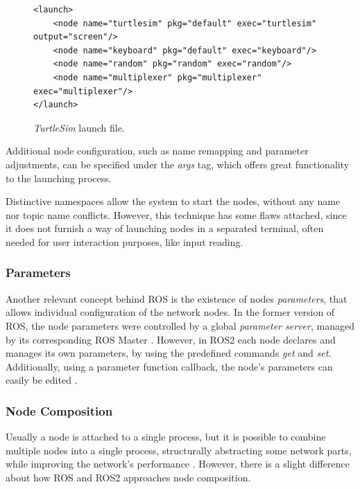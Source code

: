 \begin{figure}[H]
\begin{lstlisting}[otherkeywords={launch, node, name, pkg, exec, output}]
<launch>
    <node name="turtlesim" pkg="default" exec="turtlesim" output="screen"/>
    <node name="keyboard" pkg="default" exec="keyboard"/>
    <node name="random" pkg="random" exec="random"/>
    <node name="multiplexer" pkg="multiplexer" exec="multiplexer"/>
</launch>
\end{lstlisting}
\caption{\textit{TurtleSim} launch file.}
\label{fig:ros-lf}
\end{figure}

Additional node configuration, such as name remapping and parameter adjustments, can be specified under the \textit{args} tag, which offers great functionality to the launching process. 

Distinctive namespaces allow the system to start the nodes, without any name nor topic name conflicts. However, this technique has some flaws attached, since it does not furnish a way of launching nodes in a separated terminal, often needed for user interaction purposes, like input reading.

\subsubsection{Parameters}   

Another relevant concept behind ROS is the existence of nodes \textit{parameters}, that allows individual configuration of the network nodes. In the former version of ROS, the node parameters were controlled by a global \textit{parameter server}, managed by its corresponding ROS Master \cite{intro-ros}. However, in ROS2 each node declares and manages its own parameters, by using the predefined commands \textit{get} and \textit{set}. Additionally, using a parameter function callback, the node's parameters can easily be edited \cite{ros2documentation}.
        
\subsubsection{Node Composition}  

Usually a node is attached to a single process, but it is possible to combine multiple nodes into a single process, structurally abstracting some network parts, while improving the network's performance \cite{ros2documentation}. However, there is a slight difference about how ROS and ROS2 approaches node composition. 

